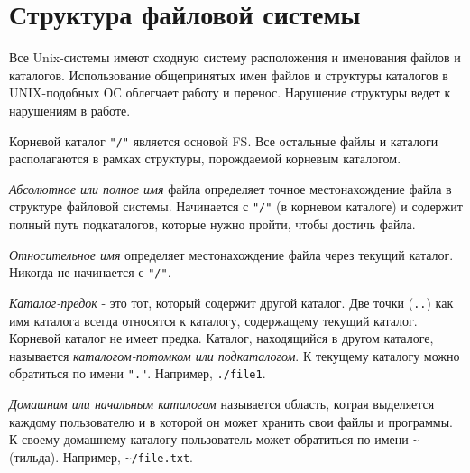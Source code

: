 \section{Структура файловой системы}

Все Unix-системы имеют сходную систему расположения и именования файлов и каталогов. Использование общепринятых имен файлов и структуры каталогов в UNIX-подобных ОС облегчает работу и перенос. Нарушение структуры ведет к нарушениям в работе.

Корневой каталог \verb+"/"+ является основой FS. Все остальные файлы и каталоги располагаются в рамках структуры, порождаемой корневым каталогом.

\emph{Абсолютное или полное имя} файла определяет точное местонахождение файла в структуре файловой системы. Начинается с \verb+"/"+ (в корневом каталоге) и содержит полный путь подкаталогов, которые нужно пройти, чтобы достичь файла.

\emph{Относительное имя} определяет местонахождение файла через текущий каталог. Никогда не начинается с \verb+"/"+.

\emph{Каталог-предок} - это тот, который содержит другой каталог. Две точки (\verb+..+) как имя каталога всегда относятся к каталогу, содержащему текущий каталог. Корневой каталог не имеет предка. Каталог, находящийся в другом каталоге, называется \emph{каталогом-потомком или подкаталогом}. К текущему каталогу можно обратиться по имени \verb+"."+. Например, \verb+./file1+.

\emph{Домашним или начальным каталогом} называется область, котрая выделяется каждому пользователю и в которой он может хранить свои файлы и программы.
К своему домашнему каталогу пользователь может обратиться по имени \verb+~+ (тильда). Например, \verb+~/file.txt+.

